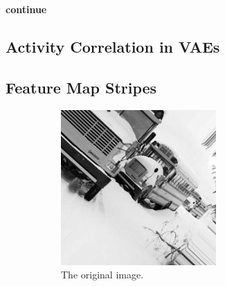 \textbf{continue}

\subsection{Activity Correlation in \acp{VAE}}\label{subsec:results_activity-correlation-in-vaes}

\subsection{Feature Map Stripes}\label{subsec:feature-map-stripes}

\begin{figure}
    \centering
    \begin{subfigure}{0.3\textwidth}
        \centering
        \includegraphics[width=\textwidth]{images/stripes/original.jpg}
        \caption{The original image.}
        \label{subfig:stripes_original}
    \end{subfigure}
    \hfill
    \begin{subfigure}{0.3\textwidth}
        \centering

\end{subfigure}
\end{figure}
